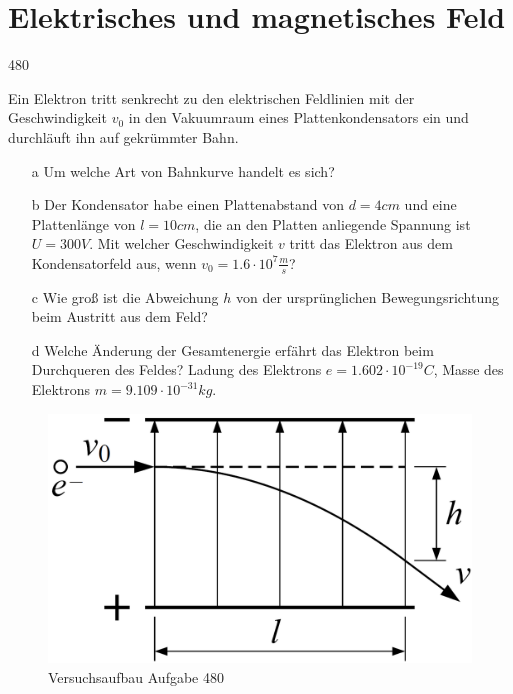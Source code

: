 \section{Elektrisches und magnetisches Feld}
\begin{auf}
    480
\end{auf}
Ein Elektron tritt senkrecht zu den elektrischen Feldlinien mit der Geschwindigkeit $v_0$ in den Vakuumraum eines Plattenkondensators ein und durchläuft ihn auf gekrümmter
Bahn.
\begin{enumerate}
    \item[a] Um welche Art von Bahnkurve handelt es sich?
    \item[b] Der Kondensator habe einen Plattenabstand von $d=4cm$ und eine Plattenlänge von $l=10cm$, die an den Platten anliegende Spannung ist $U=300V$. Mit welcher Geschwindigkeit	$v$ tritt das Elektron aus dem Kondensatorfeld aus, wenn $v_0=1.6\cdot10^7\frac{m}{s}$?
    \item[c] Wie groß ist die Abweichung $h$ von der ursprünglichen Bewegungsrichtung beim Austritt aus dem Feld?
    \item[d] Welche Änderung der Gesamtenergie erfährt das Elektron beim Durchqueren des Feldes?	Ladung des Elektrons $e=1.602\cdot10^{-19}C$, Masse des Elektrons $m=9.109\cdot10^{-31}kg$.
\end{enumerate}
\begin{figure}[h]
    \centering
    \includegraphics[width=0.7\linewidth]{images/480_0.png}
    \caption{Versuchsaufbau Aufgabe 480}
\end{figure}